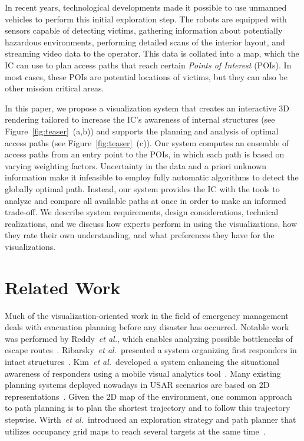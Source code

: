 \documentclass{egpubl}
\def\etal{\textit{et al.}}
\begin{document}
In recent years, technological developments made it possible to use unmanned vehicles to perform this initial exploration step. The robots are equipped with sensors capable of detecting victims, gathering information about potentially hazardous environments, performing detailed scans of the interior layout, and streaming video data to the operator. This data is collated into a map, which the IC can use to plan access paths that reach certain \emph{Points of Interest} (POIs). In most cases, these POIs are potential locations of victims, but they can also be other mission critical areas.

In this paper, we propose a visualization system that creates an interactive 3D rendering tailored to increase the IC's awareness of internal structures (see Figure~\ref{fig:teaser}~(a,b)) and supports the planning and analysis of optimal access paths (see Figure~\ref{fig:teaser}~(c)). Our system computes an ensemble of access paths from an entry point to the POIs, in which each path is based on varying weighting factors. Uncertainty in the data and a priori unknown information make it infeasible to employ fully automatic algorithms to detect the globally optimal path. Instead, our system provides the IC with the tools to analyze and compare all available paths at once in order to make an informed trade-off. We describe system requirements, design considerations, technical realizations, and we discuss how experts perform in using the visualizations, how they rate their own understanding, and what preferences they have for the visualizations.


\section{Related Work} \label{sec:relatedwork}
 Much of the visualization-oriented work in the field of emergency management deals with evacuation planning before any disaster has occurred. Notable work was performed by Reddy~\etal, which enables analyzing possible bottlenecks of escape routes~\cite{EuroVA12:13-17:2012}. Ribarsky~\etal\ presented a system organizing first responders in intact structures~\cite{Ribarsky:2010}. Kim~\etal\ developed a system enhancing the situational awareness of responders using a mobile visual analytics tool~\cite{Kim:2008}. Many existing planning systems deployed nowadays in USAR scenarios are based on 2D representations~\cite{kleiner_et_al_ssrr09,KohlbrecherMeyerStrykKlingaufFlexibleSlamSystem2011}. Given the 2D map of the environment, one common approach to path planning is to plan the shortest trajectory and to follow this trajectory stepwise. Wirth~\etal\ introduced an exploration strategy and path planner that utilizes occupancy grid maps to reach several targets at the same time~\cite{Wirth2007ETA1}.
\end{document}
